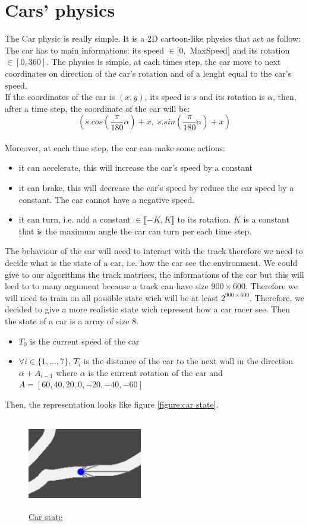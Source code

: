 \documentclass[11pt,a4paper]{article}
\newcounter{fig}
\newcommand{\mlist}[1]{\begin{itemize}[noitemsep,topsep=0pt]#1\end{itemize}}
\begin{document}
		\section{Cars' physics}
The Car physic is really simple. It is a 2D cartoon-like physics that act as follow:\\
The car has to main informations: its speed $\in [0,$ MaxSpeed$]$ and its rotation $\in [0,360]$. The physics is simple, at each times step, the car move to next coordinates on direction of the car's rotation and of a lenght equal to the car's speed.\\
If the coordinates of the car is $(x,y)$, its speed is $s$ and its rotation is $\alpha$, then, after a time step, the coordinate of the car will be:
\[(s.cos(\frac{\pi}{180}\alpha) + x,\; s.sin(\frac{\pi}{180}\alpha) + x)\]
\\
Moreover, at each time step, the car can make some actions:
\mlist{
\item it can accelerate, this will increase the car's speed by a constant
\item it can brake, this will decrease the car's speed by reduce the car speed by a constant. The car cannot have a negative speed.
\item it can turn, i.e. add a constant $\in \llbracket-K,K\rrbracket$ to its rotation. $K$ is a constant that is the maximum angle the car can turn per each time step.
}
The behaviour of the car will need to interact with the track therefore we need to decide what is the state of a car, i.e. how the car see the environment. We could give to our algorithms the track matrices, the informations of the car but this will leed to to many argument because a track can have size $900\times600$. Therefore we will need to train on all possible state wich will be at least $2^{900\times 600}$. Therefore, we decided to give a more realistic state wich represent how a car racer see. Then the state of a car is a array of size $8$.
\mlist{
\item $T_0$ is the current speed of the car
\item $\forall i\in\{1,...,7\}$, $T_i$ is the distance of the car to the next wall in the direction $\alpha + A_{i-1}$ where $\alpha$ is the current rotation of the car and $A=[60, 40, 20, 0, -20, -40, -60]$
}
Then, the representation looks like figure \ref{figure:car state}.
\begin{center}
\label{figure:car state}
	\begin{figure}[ht]
		\centering
		\includegraphics[width=5cm, height=4cm]{car_state.png}
		\caption{\underline{Car state}}
	\end{figure}
\end{center}
		
\end{document}
